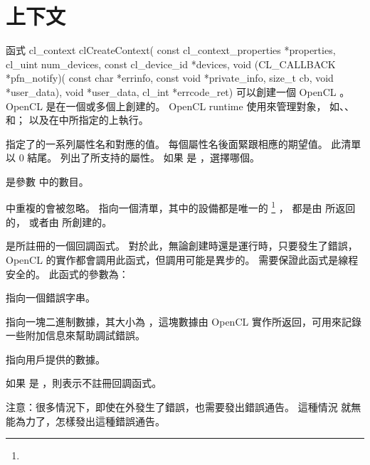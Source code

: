 \section{上下文}
函式
\startclc
cl_context clCreateContext(
		const cl_context_properties *properties,
		cl_uint num_devices,
		const cl_device_id *devices,
		void (CL_CALLBACK *pfn_notify)(
			const char *errinfo,
			const void *private_info,
			size_t cb,
			void *user_data),
		void *user_data,
		cl_int *errcode_ret)
\stopclc
可以創建一個 OpenCL 。
OpenCL 是在一個或多個上創建的。
OpenCL runtime 使用來管理對象，
如、、和；
以及在中所指定的上執行。

 指定了的一系列屬性名和對應的值。
每個屬性名後面緊跟相應的期望值。
此清單以 0 結尾。
列出了所支持的屬性。
如果  是 ，選擇哪個。

{}

 是參數  中的數目。

\startbuffer[footnoteuniquedevice]
 中重複的會被忽略。
\stopbuffer
{} 指向一個清單，其中的設備都是唯一的
\footnote{\getbuffer[footnoteuniquedevice]}
，
都是由  所返回的，
或者由  所創建的。

 是所註冊的一個回調函式。
對於此，無論創建時還是運行時，只要發生了錯誤，OpenCL 的實作都會調用此函式，但調用可能是異步的。
需要保證此函式是線程安全的。
此函式的參數為：
\startigBase
\item {} 指向一個錯誤字串。
\item {} 指向一塊二進制數據，其大小為 ，這塊數據由 OpenCL 實作所返回，可用來記錄一些附加信息來幫助調試錯誤。
\item {} 指向用戶提供的數據。
\stopigBase

如果  是 ，則表示不註冊回調函式。

注意：很多情況下，即使在外發生了錯誤，也需要發出錯誤通告。
這種情況  就無能為力了，怎樣發出這種錯誤通告。

